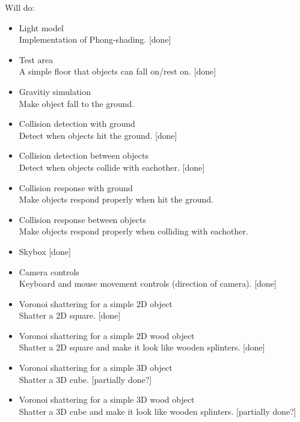 \documentclass[10pt]{article}
\begin{document}
Will do:
\begin{itemize}
  \item Light model \hfill \\
  Implementation of Phong-shading. [done]
  \item Test area \hfill \\
  A simple floor that objects can fall on/rest on. [done]
  \item Gravitiy simulation \hfill \\
  Make object fall to the ground.
  \item Collision detection with ground \hfill \\
  Detect when objects hit the ground. [done]
  \item Collision detection between objects \hfill \\
  Detect when objects collide with eachother. [done]
  \item Collision response with ground \hfill \\
  Make objects respond properly when hit the ground.
  \item Collision response between objects \hfill \\
  Make objects respond properly when colliding with eachother.
  \item Skybox [done]
  \item Camera controls \hfill \\
  Keyboard and mouse movement controls (direction of camera). [done]
  \item Voronoi shattering for a simple 2D object \hfill \\
  Shatter a 2D square. [done]
  \item Voronoi shattering for a simple 2D wood object \hfill \\
  Shatter a 2D square and make it look like wooden splinters. [done]
  \item Voronoi shattering for a simple 3D object \hfill \\
  Shatter a 3D cube. [partially done?]
  \item Voronoi shattering for a simple 3D wood object \hfill \\
  Shatter a 3D cube and make it look like wooden splinters. [partially done?]

\end{itemize}
\end{document}
